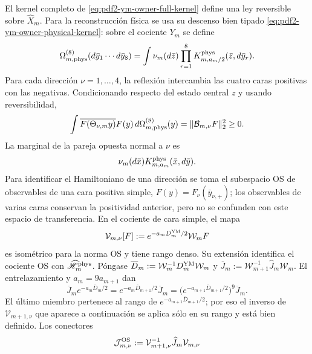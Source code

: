 El kernel completo de \eqref{eq:pdf2-ym-owner-full-kernel} define una ley reversible
sobre $\widehat X_m$. Para la reconstrucción física se usa su descenso bien tipado
\eqref{eq:pdf2-ym-owner-physical-kernel}: sobre el cociente $Y_m$ se define
\begin{equation}\label{eq:pdf2-ym-owner-eight-face-law}
 \Omega_{m,{\rm phys}}^{(8)}(d\bar y_1\cdots d\bar y_8)
 =\int\nu_m(d\bar z)
  \prod_{r=1}^8K_{m,a_m/2}^{\rm phys}(\bar z,d\bar y_r).
\end{equation}
Para cada dirección $\nu=1,\ldots,4$, la reflexión intercambia las cuatro caras
positivas con las negativas. Condicionando respecto del estado central $z$ y usando
reversibilidad,
\begin{equation}\label{eq:pdf2-ym-owner-four-os}
 \int\overline{F(\Theta_{\nu,m}y)}F(y)\,
 d\Omega_{m,{\rm phys}}^{(8)}(y)
 =\|\mathcal B_{m,\nu}F\|_2^2\ge0.
\end{equation}
La marginal de la pareja opuesta normal a $\nu$ es
\begin{equation}\label{eq:pdf2-ym-owner-os-marginal}
 \nu_m(d\bar x)K_{m,a_m}^{\rm phys}(\bar x,d\bar y).
\end{equation}
Para identificar el Hamiltoniano de una dirección se toma el subespacio OS de
observables de una cara positiva simple,
$F(y)=F_\nu(\bar y_{\nu,+})$; los observables de varias caras conservan la
positividad anterior, pero no se confunden con este espacio de transferencia. En el
cociente de cara simple, el mapa
\begin{equation}\label{eq:pdf2-ym-owner-os-unitary}
 \mathcal V_{m,\nu}[F]
 :=e^{-a_mD_m^{\rm YM}/2}\mathcal W_mF
\end{equation}
es isométrico para la norma OS y tiene rango denso. Su extensión identifica el
cociente OS con $\widehat{\mathscr H}_m^{\rm phys}$. Póngase
$\overline D_m:=\mathcal W_m^{-1}D_m^{\rm YM}\mathcal W_m$ y
$\overline J_m:=\mathcal W_{m+1}^{-1}\widehat J_m\mathcal W_m$. El
entrelazamiento y $a_m=9a_{m+1}$ dan
\begin{equation}\label{eq:pdf2-ym-owner-os-range-inclusion}
 \overline J_me^{-a_m\overline D_m/2}
 =e^{-a_m\overline D_{m+1}/2}\overline J_m
 =\bigl(e^{-a_{m+1}\overline D_{m+1}/2}\bigr)^9\overline J_m.
\end{equation}
El último miembro pertenece al rango de
$e^{-a_{m+1}\overline D_{m+1}/2}$; por eso el inverso de $\mathcal V_{m+1,\nu}$
que aparece a continuación se aplica sólo en su rango y está bien definido. Los
conectores
\begin{equation}\label{eq:pdf2-ym-owner-os-connectors}
 \mathcal J_{m,\nu}^{\rm OS}
 :=\mathcal V_{m+1,\nu}^{-1}\widehat J_m\mathcal V_{m,\nu}
\end{equation}
